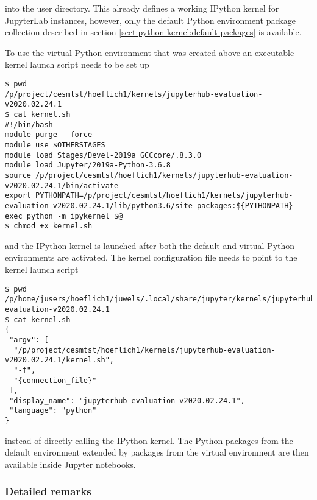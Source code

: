 \documentclass[11pt,a4paper]{article}
\begin{document}
into the user directory.
This already defines a working IPython kernel for JupyterLab instances, however, only the default Python environment package collection described in section \ref{sect:python-kernel:default-packages} is available.

To use the virtual Python environment that was created above an executable kernel launch script needs to be set up

\begin{verbatim}
$ pwd
/p/project/cesmtst/hoeflich1/kernels/jupyterhub-evaluation-v2020.02.24.1
$ cat kernel.sh
#!/bin/bash
module purge --force
module use $OTHERSTAGES
module load Stages/Devel-2019a GCCcore/.8.3.0
module load Jupyter/2019a-Python-3.6.8
source /p/project/cesmtst/hoeflich1/kernels/jupyterhub-evaluation-v2020.02.24.1/bin/activate
export PYTHONPATH=/p/project/cesmtst/hoeflich1/kernels/jupyterhub-evaluation-v2020.02.24.1/lib/python3.6/site-packages:${PYTHONPATH}
exec python -m ipykernel $@
$ chmod +x kernel.sh
\end{verbatim}

and the IPython kernel is launched after both the default and virtual Python environments are activated.
The kernel configuration file needs to point to the kernel launch script

\begin{verbatim}
$ pwd
/p/home/jusers/hoeflich1/juwels/.local/share/jupyter/kernels/jupyterhub-evaluation-v2020.02.24.1
$ cat kernel.sh
{
 "argv": [
  "/p/project/cesmtst/hoeflich1/kernels/jupyterhub-evaluation-v2020.02.24.1/kernel.sh",
  "-f",
  "{connection_file}"
 ],
 "display_name": "jupyterhub-evaluation-v2020.02.24.1",
 "language": "python"
}
\end{verbatim}

instead of directly calling the IPython kernel.
The Python packages from the default environment extended by packages from the virtual environment are then available inside Jupyter notebooks.

\subsubsection{Detailed remarks}
\end{document}
